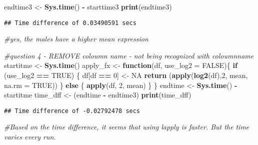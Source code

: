 \documentclass[]{article}
\newenvironment{Shaded}{\begin{snugshade}}{\end{snugshade}}
\newcommand{\KeywordTok}[1]{\textcolor[rgb]{0.13,0.29,0.53}{\textbf{#1}}}
\newcommand{\DataTypeTok}[1]{\textcolor[rgb]{0.13,0.29,0.53}{#1}}
\newcommand{\DecValTok}[1]{\textcolor[rgb]{0.00,0.00,0.81}{#1}}
\newcommand{\StringTok}[1]{\textcolor[rgb]{0.31,0.60,0.02}{#1}}
\newcommand{\CommentTok}[1]{\textcolor[rgb]{0.56,0.35,0.01}{\textit{#1}}}
\newcommand{\OtherTok}[1]{\textcolor[rgb]{0.56,0.35,0.01}{#1}}
\newcommand{\ControlFlowTok}[1]{\textcolor[rgb]{0.13,0.29,0.53}{\textbf{#1}}}
\newcommand{\OperatorTok}[1]{\textcolor[rgb]{0.81,0.36,0.00}{\textbf{#1}}}
\newcommand{\NormalTok}[1]{#1}
\begin{document}
\begin{Shaded}
\begin{Highlighting}[]
\NormalTok{endtime3 <-}\StringTok{ }\KeywordTok{Sys.time}\NormalTok{() }\OperatorTok{-}\StringTok{ }\NormalTok{starttime3}
\KeywordTok{print}\NormalTok{(endtime3)}
\end{Highlighting}
\end{Shaded}

\begin{verbatim}
## Time difference of 0.03490591 secs
\end{verbatim}

\begin{Shaded}
\begin{Highlighting}[]
\CommentTok{#yes, the males have a higher mean expression}
\end{Highlighting}
\end{Shaded}

\begin{Shaded}
\begin{Highlighting}[]
\CommentTok{#question 4 - REMOVE coloumn name - not being recognized with coloumnname}
\NormalTok{startitme <-}\StringTok{ }\KeywordTok{Sys.time}\NormalTok{()}
\NormalTok{apply_fx <-}\StringTok{ }\ControlFlowTok{function}\NormalTok{(df, }\DataTypeTok{use_log2 =} \OtherTok{FALSE}\NormalTok{)\{}
  \ControlFlowTok{if}\NormalTok{ (use_log2 }\OperatorTok{==}\StringTok{ }\OtherTok{TRUE}\NormalTok{) \{}
\NormalTok{   df[df }\OperatorTok{==}\StringTok{ }\DecValTok{0}\NormalTok{] <-}\StringTok{ }\OtherTok{NA}
    \KeywordTok{return}\NormalTok{ (}\KeywordTok{apply}\NormalTok{(}\KeywordTok{log2}\NormalTok{(df),}\DecValTok{2}\NormalTok{, mean, }\DataTypeTok{na.rm =} \OtherTok{TRUE}\NormalTok{))}
\NormalTok{    \} }\ControlFlowTok{else}\NormalTok{ \{}
    \KeywordTok{apply}\NormalTok{(df, }\DecValTok{2}\NormalTok{, mean)}
\NormalTok{    \} }
\NormalTok{\}}
\NormalTok{endtime <-}\StringTok{ }\KeywordTok{Sys.time}\NormalTok{() }\OperatorTok{-}\StringTok{ }\NormalTok{startitme}
\NormalTok{time_dff <-}\StringTok{ }\NormalTok{(endtime }\OperatorTok{-}\StringTok{ }\NormalTok{endtime3)}
\KeywordTok{print}\NormalTok{(time_dff)}
\end{Highlighting}
\end{Shaded}

\begin{verbatim}
## Time difference of -0.02792478 secs
\end{verbatim}

\begin{Shaded}
\begin{Highlighting}[]
\CommentTok{#Based on the time difference, it seems that using lapply is faster. But the time varies every run. }
\end{Highlighting}
\end{Shaded}
\end{document}
